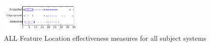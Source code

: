 
\begin{figure}[t]
\centering
\includegraphics[width=0.36\textwidth]{figures/flt/all_tiny}
\caption{ALL Feature Location effectiveness measures for all subject systems}
\label{fig:flt:all:tiny}
\end{figure}
